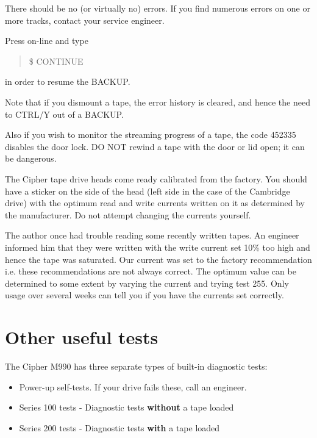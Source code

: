 There should be no (or virtually no) errors. If you find numerous errors
on one or more tracks, contact your service engineer.

Press on-line and type

\begin{quote}

\$ CONTINUE

\end{quote}

in order to resume the BACKUP.

Note that if you dismount a tape, the error history is cleared, and 
hence the need to CTRL/Y out of a BACKUP.

Also if you wish to monitor the streaming progress of a tape,
the code 452335 disables the door lock. DO NOT rewind a tape with
the door or lid open; it can be dangerous.

The Cipher tape drive heads come ready calibrated from the factory. You should
have a sticker on the side of the head (left side in the case of the Cambridge
drive) with the optimum read and write currents written on it as determined by
the manufacturer. Do not attempt changing the currents yourself.

The author once had trouble reading some recently written tapes. 
An engineer informed him that they were written with the write current set
10\% too high and hence the tape was saturated. Our current was set to the
factory recommendation i.e. these recommendations are not always correct.
The optimum value can be determined to some extent by varying the current
and trying test 255. Only usage over several weeks
can tell you if you have the currents set correctly.

\section{Other useful tests}

The Cipher M990 has three separate types of built-in diagnostic tests:

\begin{itemize}

\item Power-up self-tests. If your drive fails these, call an engineer.

\item Series 100 tests - Diagnostic tests {\bf without} a tape loaded

\item Series 200 tests - Diagnostic tests {\bf with} a tape loaded

\end {itemize}

